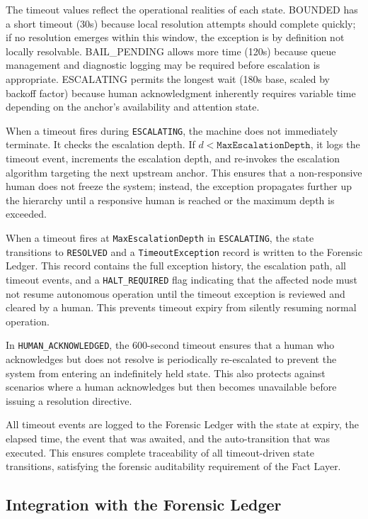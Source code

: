 The timeout values reflect the operational realities of each state. BOUNDED has a short timeout (30s) because local resolution attempts should complete quickly; if no resolution emerges within this window, the exception is by definition not locally resolvable. BAIL\_PENDING allows more time (120s) because queue management and diagnostic logging may be required before escalation is appropriate. ESCALATING permits the longest wait (180s base, scaled by backoff factor) because human acknowledgment inherently requires variable time depending on the anchor's availability and attention state.

When a timeout fires during \texttt{ESCALATING}, the machine does not immediately terminate. It checks the escalation depth. If $d < \texttt{MaxEscalationDepth}$, it logs the timeout event, increments the escalation depth, and re-invokes the escalation algorithm targeting the next upstream anchor. This ensures that a non-responsive human does not freeze the system; instead, the exception propagates further up the hierarchy until a responsive human is reached or the maximum depth is exceeded.

When a timeout fires at \texttt{MaxEscalationDepth} in \texttt{ESCALATING}, the state transitions to \texttt{RESOLVED} and a \texttt{TimeoutException} record is written to the Forensic Ledger. This record contains the full exception history, the escalation path, all timeout events, and a \texttt{HALT\_REQUIRED} flag indicating that the affected node must not resume autonomous operation until the timeout exception is reviewed and cleared by a human. This prevents timeout expiry from silently resuming normal operation.

In \texttt{HUMAN\_ACKNOWLEDGED}, the 600-second timeout ensures that a human who acknowledges but does not resolve is periodically re-escalated to prevent the system from entering an indefinitely held state. This also protects against scenarios where a human acknowledges but then becomes unavailable before issuing a resolution directive.

All timeout events are logged to the Forensic Ledger with the state at expiry, the elapsed time, the event that was awaited, and the auto-transition that was executed. This ensures complete traceability of all timeout-driven state transitions, satisfying the forensic auditability requirement of the Fact Layer.

\subsection{Integration with the Forensic Ledger}

